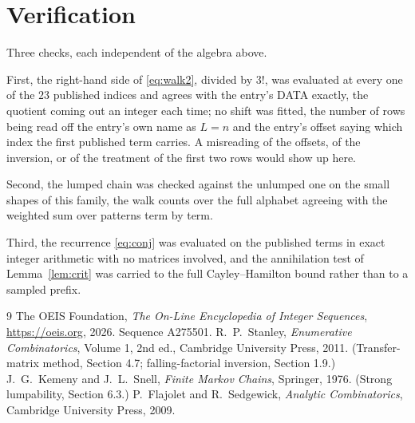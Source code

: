 \documentclass[11pt,a4paper]{article}
\theoremstyle{plain}
\theoremstyle{definition}
\begin{document}
\section{Verification}

Three checks, each independent of the algebra above.

First, the right-hand side of \eqref{eq:walk2}, divided by $3!$, was evaluated at every
one of the $23$ published indices and agrees with the entry's DATA exactly, the quotient
coming out an integer each time; no shift was fitted, the number of rows being read off the
entry's own name as $L=n$ and the entry's offset saying which index the first published
term carries. A misreading of the offsets, of the inversion, or of the treatment of the first
two rows would show up here.

Second, the lumped chain was checked against the unlumped one on the small shapes of this
family, the walk counts over the full alphabet agreeing with the weighted sum over patterns
term by term.

Third, the recurrence \eqref{eq:conj} was evaluated on the published terms in exact integer
arithmetic with no matrices involved, and the annihilation test of Lemma~\ref{lem:crit} was
carried to the full Cayley--Hamilton bound rather than to a sampled prefix.

\begin{thebibliography}{9}
 The OEIS Foundation, \emph{The On-Line Encyclopedia of Integer
Sequences}, \url{https://oeis.org}, 2026. Sequence A275501.
 R.~P.~Stanley, \emph{Enumerative Combinatorics}, Volume 1, 2nd ed.,
Cambridge University Press, 2011. (Transfer-matrix method, Section 4.7; falling-factorial
inversion, Section 1.9.)
 J.~G.~Kemeny and J.~L.~Snell, \emph{Finite Markov Chains}, Springer,
1976. (Strong lumpability, Section 6.3.)
 P.~Flajolet and R.~Sedgewick, \emph{Analytic Combinatorics}, Cambridge
University Press, 2009.
\end{thebibliography}
\end{document}

